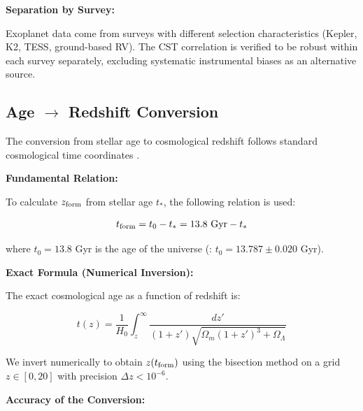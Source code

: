 \documentclass[11pt,a4paper]{article}
\begin{document}
\textbf{Separation by Survey:}

Exoplanet data come from surveys with different selection
characteristics (Kepler, K2, TESS, ground-based RV). The CST correlation
is verified to be robust within each survey separately, excluding
systematic instrumental biases as an alternative source.

\hypertarget{age-redshift-conversion}{%
\subsection{Age $\rightarrow$ Redshift
Conversion}\label{age-redshift-conversion}

The conversion from stellar age to cosmological redshift follows standard cosmological time coordinates \cite{ref25}.}

\textbf{Fundamental Relation:}

To calculate \(z_{\rm form}\) from stellar age \(t_*\), the following
relation is used:

\[t_{\rm form} = t_0 - t_* = 13.8~{\rm Gyr} - t_*\]

where \(t_0 = 13.8\) Gyr is the age of the universe (\cite{PlanckCollaboration2020a}:
\(t_0 = 13.787 \pm 0.020\) Gyr).

\textbf{Exact Formula (Numerical Inversion):}

The exact cosmological age as a function of redshift is:

\[t(z) = \frac{1}{H_0}\int_z^\infty \frac{dz'}{(1+z')\sqrt{\Omega_m(1+z')^3 + \Omega_\Lambda}}\]

We invert numerically to obtain \(z(t_{\rm form})\) using the bisection
method on a grid \(z \in [0, 20]\) with precision
\(\Delta z < 10^{-6}\).

\textbf{Accuracy of the Conversion:}
\end{document}
